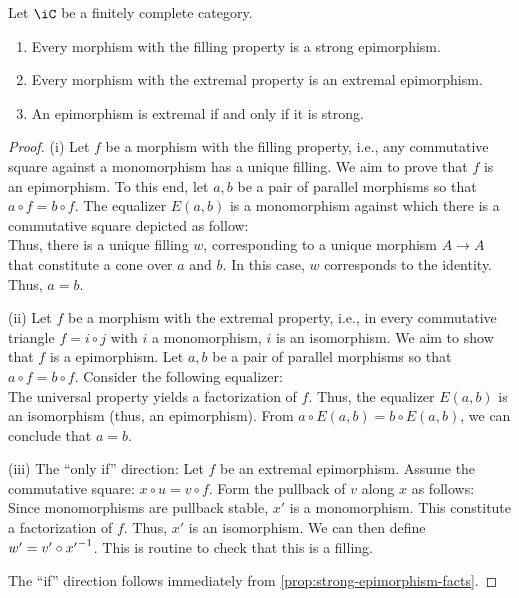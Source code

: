 \documentclass{amsart}
\begin{document}
\begin{prop}\label{prop:fcc-strong-epimorphism-facts}
  Let $\iC$ be a finitely complete category.
  \begin{enumerate}
  \item Every morphism with the filling property is a strong epimorphism.
  \item Every morphism with the extremal property is an extremal epimorphism.
  \item An epimorphism is extremal if and only if it is strong.
  \end{enumerate}
\end{prop}
\begin{proof}
  (i) Let $f$ be a morphism with the filling property, i.e., any commutative square against a monomorphism has a unique filling.
  We aim to prove that $f$ is an epimorphism.
  To this end, let $a,b$ be a pair of parallel morphisms so that $a \circ f = b \circ f$.
  The equalizer $E(a,b)$ is a monomorphism against which there is a commutative square depicted as follow:
  \[\]
  Thus, there is a unique filling $w$, corresponding to a unique morphism $A \to A$ that constitute a cone over $a$ and $b$.
  In this case, $w$ corresponds to the identity.
  Thus, $a = b$.

  (ii) Let $f$ be a morphism with the extremal property, i.e., in every commutative triangle $f = i \circ j$ with $i$ a monomorphism, $i$ is an isomorphism.
  We aim to show that $f$ is a epimorphism.
  Let $a,b$ be a pair of parallel morphisms so that $a \circ f = b \circ f$.
  Consider the following equalizer:
  \[\]
  The universal property yields a factorization of $f$.
  Thus, the equalizer $E(a,b)$ is an isomorphism (thus, an epimorphism).
  From $a \circ E(a,b) = b \circ E(a,b)$, we can conclude that $a = b$.

  (iii) The ``only if'' direction: Let $f$ be an extremal epimorphism.
  Assume the commutative square: $x \circ u = v \circ f$.
  Form the pullback of $v$ along $x$ as follows:
  \[\]
  Since monomorphisms are pullback stable, $x'$ is a monomorphism.
  This constitute a factorization of $f$.
  Thus, $x'$ is an isomorphism.
  We can then define $w' = v' \circ {x'}^{-1}$.
  This is routine to check that this is a filling.

  The ``if'' direction follows immediately from \cref{prop:strong-epimorphism-facts}.
\end{proof}
\end{document}
